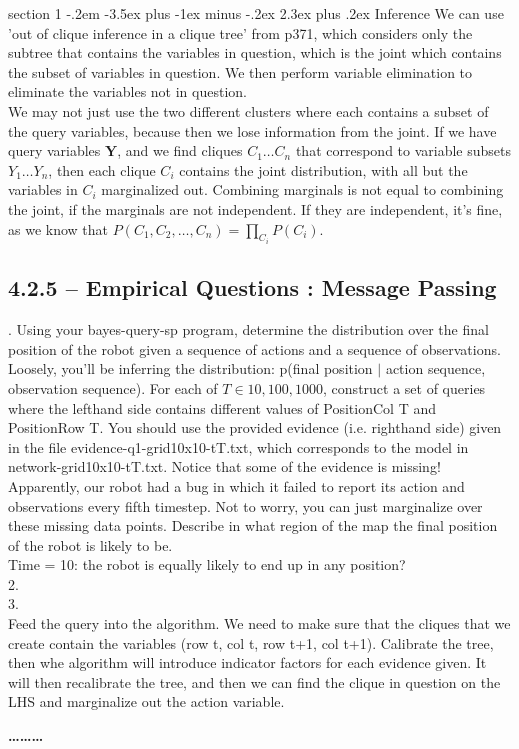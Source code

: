 \documentclass[12pt]{article}
\makeatletter
\newenvironment{problem}{\@startsection
       {section}
       {1}
       {-.2em}
       {-3.5ex plus -1ex minus -.2ex}
       {2.3ex plus .2ex}
       {\pagebreak[3]%
       \large\bf\noindent{Problem }
       }
       }
       {%
       \begin{center}\large\bf \ldots\ldots\ldots\end{center}}
\makeatother
\begin{document}
\begin{problem}{Inference}
We can use 'out of clique inference in a clique tree' from p371, which considers only the subtree that contains the variables in question, which is the joint which contains the subset of variables in question.  We then perform variable elimination to eliminate the variables not in question.\\
We may not just use the two different clusters where each contains a subset of the query variables, because then we lose information from the joint.  If we have query variables $\textbf{Y}$, and we find cliques $C_1 \ldots C_n$ that correspond to variable subsets $Y_1 \ldots Y_n$, then each clique $C_i$ contains the joint distribution, with all but the variables in $C_i$ marginalized out.  Combining marginals is not equal to combining the joint, if the marginals are not independent.  If they are independent, it's fine, as we know that $P(C_1,C_2,\ldots,C_n) = \prod_{C_i} P(C_i)$.\\

\subsection*{4.2.5 -- Empirical Questions : Message Passing}

. Using your bayes-query-sp program, determine the distribution over the final position of the robot given a sequence of actions and a sequence of observations. Loosely, you'll be inferring the distribution: p(final position $\mid$ action sequence, observation sequence). For each of $T \in {10,100,1000}$, construct a set of queries where the lefthand side contains different values of PositionCol T and PositionRow T. You should use the provided evidence (i.e. righthand side) given in the file evidence-q1-grid10x10-tT.txt, which corresponds to the model in network-grid10x10-tT.txt. Notice that some of the evidence is missing! Apparently, our robot had a bug in which it failed to report its action and observations every fifth timestep. Not to worry, you can just marginalize over these missing data points. Describe in what region of the map the final position of the robot is likely to be.\\
Time = 10: the robot is equally likely to end up in any position?\\

2.\\

3.\\

Feed the query into the algorithm.  We need to make sure that the cliques that we create contain the variables (row t, col t, row t+1, col t+1).  Calibrate the tree, then whe algorithm will introduce indicator factors for each evidence given.  It will then recalibrate the tree, and then we can find the clique in question on the LHS and marginalize out the action variable.\\


\end{problem}
\end{document}

